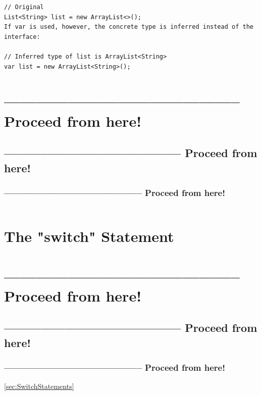 \documentclass[11pt,a4paper, titlepage, parskip=half, headsepline, footsepline, cleardoublepage=current, headheight=1cm]{scrbook}
\begin{document}
\begin{lstlisting}
// Original
List<String> list = new ArrayList<>();
If var is used, however, the concrete type is inferred instead of the interface:

// Inferred type of list is ArrayList<String>
var list = new ArrayList<String>();
\end{lstlisting}

\section{-------------------------------------------- Proceed from here!}
\subsection{-------------------------------------------- Proceed from here!}
\subsubsection{-------------------------------------------- Proceed from here!}
\autocite{Cymerman:SmarterJavaDevelopment}
\autocite{Fejer:ProgramToInterfaces}
\autocite{Pavlutin:ProgrammingToInterface}
\autocite{}
\autocite{}
\autocite{}
\autocite{}
\autocite{}
\autocite{}
\autocite{}
\lipsum[5]

\begin{lstlisting}
\end{lstlisting}

\section{The "switch" Statement}\label{sec:TheSwitchStatement}
\section{-------------------------------------------- Proceed from here!}
\subsection{-------------------------------------------- Proceed from here!}
\subsubsection{-------------------------------------------- Proceed from here!}
\lipsum[5]
\ref{sec:SwitchStatements}

\begin{lstlisting}
\end{lstlisting}
\end{document}
